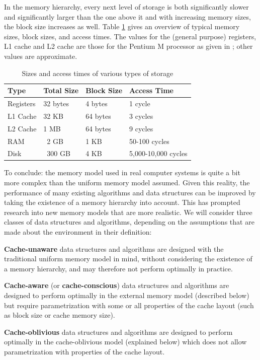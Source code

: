 \documentclass{acm_proc_article-sp}
\begin{document}
In the memory hierarchy, every next level of storage is both significantly slower and significantly larger than the one above it and with increasing memory sizes, the block size increases as well. Table \ref{tab-memhier} gives an overview of typical memory sizes, block sizes, and access times. The values for the (general purpose) registers, L1 cache and L2 cache are those for the Pentium M processor as given in \cite{intel-opt}; other values are approximate.

\begin{table}
\begin{center}
\begin{tabular}{ l l l l }
\hline
\textbf{Type} & \textbf{Total Size} & \textbf{Block Size} & \textbf{Access Time} \\
\hline
Registers  &   32 bytes & 4 bytes & 1 cycle \\
L1 Cache   &   32 KB    & 64 bytes & 3 cycles \\
L2 Cache   &    1 MB    & 64 bytes & 9 cycles \\
RAM        &   ~2 GB    & 1 KB     & 50-100 cycles \\
Disk       & ~300 GB    & 4 KB     & 5,000-10,000 cycles \\
\hline
\end{tabular}
\caption{Sizes and access times of various types of storage}
\label{tab-memhier}
\end{center}
\end{table}

To conclude: the memory model used in real computer systems is quite a bit more complex than the uniform memory model assumed. Given this reality, the performance of many existing algorithms and data structures can be improved by taking the existence of a memory hierarchy into account. This has prompted research into new memory models that are more realistic. We will consider three classes of data structures and algorithms, depending on the assumptions that are made about the environment in their definition:
\begin{list}{}{}
\item \textbf{Cache-unaware} data structures and algorithms are designed with the traditional uniform memory model in mind, without considering the existence of a memory hierarchy, and may therefore not perform optimally in practice.
\item \textbf{Cache-aware} (or \textbf{cache-conscious}) data structures and algorithms are designed to perform optimally in the external memory model (described below) but require parametrization with some or all properties of the cache layout (such as block size or cache memory size).
\item \textbf{Cache-oblivious} data structures and algorithms are designed to perform optimally in the cache-oblivious model (explained below) which does not allow para\-metri\-zation with properties of the cache layout.
\end{list}
\end{document}

